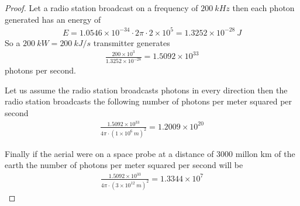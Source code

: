 \documentclass[11pt]{article}
\theoremstyle{definition}
\begin{document}
\cleardoublepage
\begin{proof}{1.2}
Let a radio station broadcast on a frequency of $200~kHz$ then each photon
generated has an energy of
\begin{align*}
    E = 1.0546 \times 10^{-34} \cdot 2\pi \cdot 2 \times 10^5
    = 1.3252 \times 10^{-28}~J
\end{align*}
So a $200~kW = 200~kJ/s$ transmitter generates 
\begin{align*}
    \frac{200\times 10^3}{1.3252 \times 10^{-28}}
    = 1.5092 \times 10^{33}
\end{align*}
photons per second.

Let us assume the radio station broadcasts photons in every direction then 
the radio station broadcasts the following number of photons per meter squared
per second
\begin{align*}
    \frac{1.5092 \times 10^{33}}{4\pi\cdot (1\times 10^6~m)^2}
    = 1.2009 \times 10^{20}
\end{align*}

Finally if the aerial were on a space probe at a distance of 3000 millon km of
the earth the number of photons per meter squared per second will be
\begin{align*}
    \frac{1.5092 \times 10^{33}}{4\pi\cdot (3 \times 10^{12}~m)^2}
    = 1.3344 \times 10^{7}
\end{align*}
\end{proof}
\end{document}
